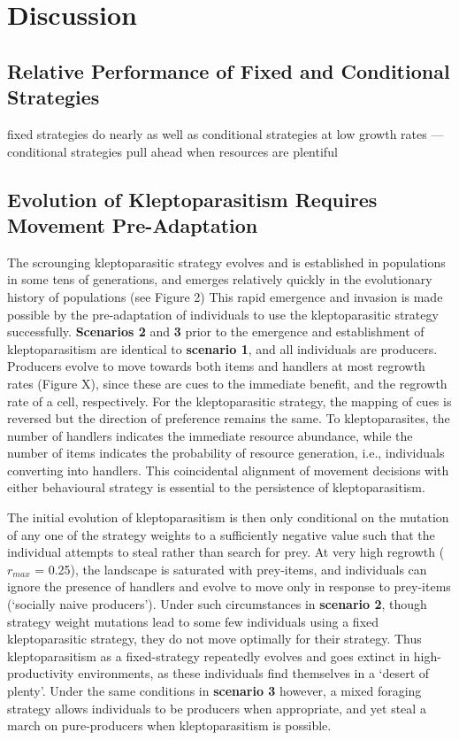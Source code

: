 \documentclass[11pt]{article}
\begin{document}
\section{Discussion}

\subsection{Relative Performance of Fixed and Conditional Strategies}

fixed strategies do nearly as well as conditional strategies at low growth rates --- conditional strategies pull ahead when resources are plentiful

\subsection{Evolution of Kleptoparasitism Requires Movement Pre-Adaptation}

The scrounging kleptoparasitic strategy evolves and is established in populations in some tens of generations, and emerges relatively quickly in the evolutionary history of populations (see Figure 2)
This rapid emergence and invasion is made possible by the pre-adaptation of individuals to use the kleptoparasitic strategy successfully.
\textbf{Scenarios 2} and \textbf{3} prior to the emergence and establishment of kleptoparasitism are identical to \textbf{scenario 1}, and all individuals are producers.
Producers evolve to move towards both items and handlers at most regrowth rates (Figure X), since these are cues to the immediate benefit, and the regrowth rate of a cell, respectively.
For the kleptoparasitic strategy, the mapping of cues is reversed but the direction of preference remains the same.
To kleptoparasites, the number of handlers indicates the immediate resource abundance, while the number of items indicates the probability of resource generation, i.e., individuals converting into handlers.
This coincidental alignment of movement decisions with either behavioural strategy is essential to the persistence of kleptoparasitism.

The initial evolution of kleptoparasitism is then only conditional on the mutation of any one of the strategy weights to a sufficiently negative value such that the individual attempts to steal rather than search for prey.
At very high regrowth ($r_{max}$ = 0.25), the landscape is saturated with prey-items, and individuals can ignore the presence of handlers and evolve to move only in response to prey-items (`socially naive producers').
Under such circumstances in \textbf{scenario 2}, though strategy weight mutations lead to some few individuals using a fixed kleptoparasitic strategy, they do not move optimally for their strategy.
Thus kleptoparasitism as a fixed-strategy repeatedly evolves and goes extinct in high-productivity environments, as these individuals find themselves in a `desert of plenty'.
Under the same conditions in \textbf{scenario 3} however, a mixed foraging strategy allows individuals to be producers when appropriate, and yet steal a march on pure-producers when kleptoparasitism is possible.
\end{document}
